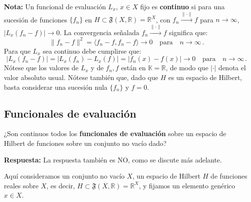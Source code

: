 \noindent\textbf{Nota:} Un funcional de evaluaci\'on $L_x$, $x\in X$ fijo es
\textbf{continuo} si para una sucesi\'on de funciones $\{f_n\}$ en
$H\subset\mathfrak{F}(X,\mathbb{R})=\mathbb{R}^X$, con $f_n
\overset{\|\cdot\|}{\rightarrow}f$ para $n\rightarrow\infty$,
$|L_x(f_n-f)| \rightarrow 0$.  
La convergencia se\~nalada $f_n \overset{\|\cdot\|}{\rightarrow}f$
significa que:
\begin{equation*}
\|f_n-f\|^2 = \langle f_n-f, f_n -f \rangle \rightarrow 0
\quad\text{para}\quad n\rightarrow\infty\,.
\end{equation*}
Para que $L_x$ sea continuo debe cumplirse que:
\begin{equation}\label{stetigkeit}
|L_x(f_n-f)| = |L_x(f_n)-L_x(f)| = |f_n(x) -f(x)| \rightarrow 0 
\quad\text{para}\quad n\rightarrow\infty\,.
\end{equation}
N\'otese que los valores de $L_x$ y de $f_n,f$ est\'an en
$\mathbb{K}=\mathbb{R}$, de modo que $|\cdot|$ denota el valor absoluto
usual.
N\'otese tambi\'en que, dado que $H$ es un espacio de Hilbert,
basta considerar una sucesi\'on nula $\{f_n\}$ y $f=0$.



\subsection{Funcionales de evaluación}
¿Son continuos todos los \textbf{funcionales de evaluación} sobre un
espacio de Hilbert de funciones sobre un conjunto no vacío dado?

\textbf{Respuesta:}
La respuesta tambi\'en es NO, como se discute m\'as adelante.



Aquí consideramos un conjunto no vacío $X$, un espacio de Hilbert
$H$ de funciones reales sobre $X$, es decir,
$H\subset\mathfrak{F}(X,\mathbb{R})=\mathbb{R}^X$, y fijamos un
elemento genérico $x\in X$.



